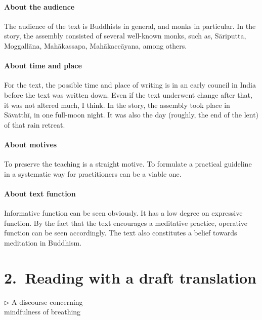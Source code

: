 \paragraph*{About the audience} The audience of the text is Buddhists in general, and monks in particular. In the story, the assembly consisted of several well-known monks, such as, S\=ariputta, Moggall\=ana, Mah\=akassapa, Mah\=akacc\=ayana, among others.

\paragraph*{About time and place} For the text, the possible time and place of writing is in an early council in India before the text was written down. Even if the text underwent change after that, it was not altered much, I think. In the story, the assembly took place in S\=avatth\=i, in one full-moon night. It was also the  day (roughly, the end of the lent) of that rain retreat.

\paragraph*{About motives} To preserve the teaching is a straight motive. To formulate a practical guideline in a systematic way for practitioners can be a viable one.

\paragraph*{About text function} Informative function can be seen obviously. It has a low degree on expressive function. By the fact that the text encourages a meditative practice, operative function can be seen accordingly. The text also constitutes a belief towards meditation in Buddhism.

{}
\section*{2.\ Reading with a draft translation}

\bigskip
\begin{center}
\textbf{}\par
$\triangleright$ A discourse concerning\\mindfulness of breathing
\end{center}

